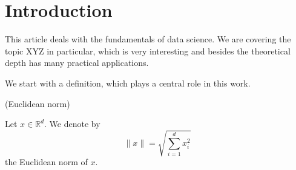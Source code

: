 \section{Introduction}
This article deals with the fundamentals of data science. We are covering the topic XYZ in particular, 
which is very interesting and besides the theoretical depth has many practical applications.

We start with a definition, which plays a central role in this work.

\begin{definition}{(Euclidean norm)}
    \begin{linenomath*}
	    Let $x\in\mathbb{R}^d$. We denote by $$\|x\|=\sqrt{\sum_{i=1}^{d} x_i^2}$$ the Euclidean norm of $x$.
    \end{linenomath*}
\end{definition}